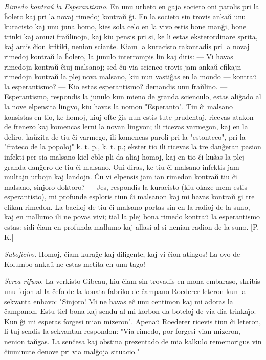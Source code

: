 \emph{Rimedo kontra\u u la Esperantismo}. En unu urbeto en gaja
societo oni parolis pri la \^holero kaj pri la novaj rimedoj
kontra\u u \^gi. En la societo sin trovis anka\u u unu kuracisto kaj
unu juna homo, kies sola celo en la vivo estis bone man\^gi, bone
trinki kaj amuzi fra\u ulinojn, kaj kiu pensis pri si, ke li estas
eksterordinare sprita, kaj amis \^cion kritiki, nenion sciante. Kiam
la kuracisto rakontadis pri la novaj rimedoj kontra\u u la \^holero,
la junulo interrompis lin kaj diris: --- Vi havas rimedojn kontra\u
u \^ciuj malsanoj; sed \^cu via scienco trovis jam anka\u u efikajn
rimedojn kontra\u u la plej nova malsano, kiu nun vasti\^gas en la
mondo --- kontra\u u la esperantismo? --- Kio estas esperantismo?
demandis unu fra\u ulino. --- Esperantismo, respondis la junulo kun
mieno de granda scienculo, estas ali\^gado al la nove elpensita
lingvo, kiu havas la nomon "Esperanto". Tiu \^ci malsano konsistas
en tio, ke homoj, kiuj ofte \^gis nun estis tute prudentaj, ricevas
atakon de frenezo kaj komencas lerni la novan lingvon; ili ricevas
varmegon, kaj en la deliro, ka\u uzita de tiu \^ci varmego, ili
komencas paroli pri la "estonteco", pri la "frateco de la
popoloj" k. t. p., k. t. p.; ekster tio ili ricevas la tre
dan\^geran pasion infekti per sia malsano kiel eble pli da aliaj
homoj, kaj en tio \^ci ku\^sas la plej granda dan\^gero de tiu \^ci
malsano. Oni diras, ke tiu \^ci malsano infektis jam multajn urbojn
kaj landojn. \^Cu vi elpensis jam ian rimedon kontra\u u tiu \^ci
malsano, sinjoro doktoro? --- Jes, respondis la kuracisto (kiu okaze
mem estis esperantisto), mi profunde esploris tiun \^ci malsanon kaj
mi havas kontra\u u gi tre efikan rimedon. La baciloj de tiu \^ci
malsano portas sin en la radioj de la suno, kaj en mallumo ili ne
povas vivi; tial la plej bona rimedo kontra\u u la esperantismo
estas: sidi \^ciam en profunda mallumo kaj allasi al si nenian
radion de la suno. [P. K.]

\emph{Suboficiro}. Homoj, \^ciam kura\^ge kaj diligente, kaj vi
\^cion atingos! La ovo de Kolumbo anka\u u ne estas metita en unu
tago!

\emph{\^Serca rifuzo}. La verkisto Gibeau, kiu \^ciam sin trovadis
en mona embaraso, skribis unu fojon al la \^cefo de la konata
fabriko de \^campano Roederer leteron kun la sekvanta enhavo:
"Sinjoro! Mi ne havas e\^c unu centimon kaj mi adoras la
\^campanon. Estu tiel bona kaj sendu al mi korbon da boteloj de via
dia trinka\^{\j}o. Kun \^gi mi esperas forgesi mian mizeron".
Apena\u u Roederer ricevis tiun \^ci leteron, li tuj sendis la
sekvantan respondon: "Via rimedo, por forgesi vian mizeron, nenion
ta\u ugas. La sen\^cesa kaj obstina prezentado de mia kalkulo
rememorigus vin \^ciuminute denove pri via mal\^goja situacio."

